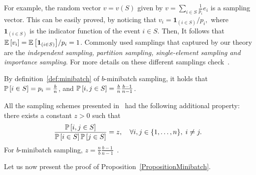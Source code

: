 \documentclass{article}
\begin{document}
For example, the random vector $v=v(S)$ given by $v = \sum_{i\in S} \frac{1}{p_i} e_i$ is a sampling vector. This can be easily proved, by noticing that $v_i =  \mathbf{1}_{(i\in S)}/p_i,$ where $\mathbf{1}_{(i\in S)}$ is the indicator function of the event $i\in S$. Then, It follows that ${\mathbb{E}\left[v_i\right] } = {\mathbb{E}\left[\mathbf{1}_{(i\in S)}\right] }/p_i = 1$. 
Commonly used samplings that captured by our theory are the \textit{independent sampling, partition sampling, single-element sampling and importance sampling}. For more details on these different samplings check~\cite{gower2019sgd}.

By definition~\ref{def:minibatch} of $b$-minibatch sampling, it holds that $\mathbb{P} \left[ i\in S\right] = p_i = \frac{b}{n}$, and  $\mathbb{P} \left[ i,j\in S\right] = \frac{b}{n}\frac{b-1}{n-1} $.

All the sampling schemes presented in~\citet{gower2019sgd} had the following additional property: there exists a constant $z>0$ such that 
\begin{equation}\label{eq:indep}
 \frac{\mathbb{P} \left[ i,j \in S\right]}{\mathbb{P} \left[ i \in S\right] \mathbb{P} \left[ j \in S\right]} = z, \quad \forall i,j \in \{1,\ldots, n\}, \; i\neq j. 
\end{equation}
For $b$-minibatch sampling, $z =\frac{n}{b}\frac{b-1}{n-1}$~\citep{gower2021sgd}.

Let us now present the proof of Proposition~\ref{PropositionMinibatch}.
\end{document}
